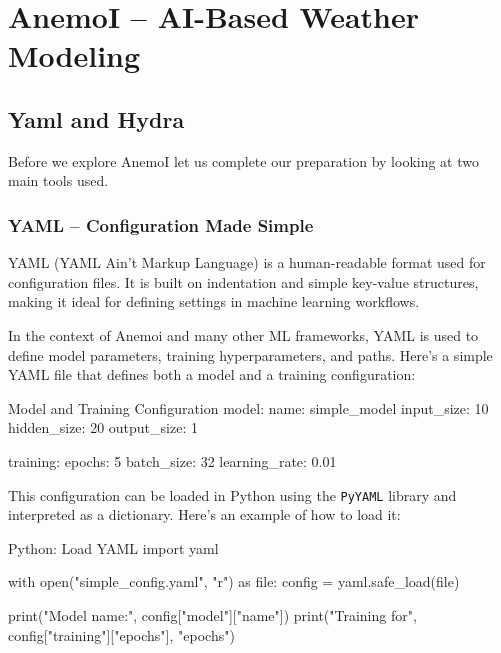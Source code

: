 \chapter{AnemoI – AI-Based Weather Modeling}

%
\section{Yaml and Hydra}

Before we explore AnemoI let us complete our preparation by looking at two main tools used. 

%
\subsection{YAML – Configuration Made Simple}

YAML (YAML Ain't Markup Language) is a human-readable format used for configuration files. It is built on indentation and simple key-value structures, making it ideal for defining settings in machine learning workflows.

In the context of Anemoi and many other ML frameworks, YAML is used to define model parameters, training hyperparameters, and paths. Here's a simple YAML file that defines both a model and a training configuration:

\begin{codeonly}{Model and Training Configuration}
model:
  name: simple_model
  input_size: 10
  hidden_size: 20
  output_size: 1

training:
  epochs: 5
  batch_size: 32
  learning_rate: 0.01
\end{codeonly}

This configuration can be loaded in Python using the \texttt{PyYAML} library and interpreted as a dictionary. Here's an example of how to load it:

\begin{codeonly}{Python: Load YAML}
import yaml

with open("simple_config.yaml", "r") as file:
    config = yaml.safe_load(file)

print("Model name:", config["model"]["name"])
print("Training for", config["training"]["epochs"], "epochs")
\end{codeonly}

